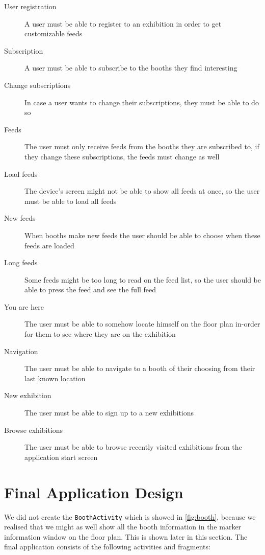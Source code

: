 \begin{description}
\item[User registration] A user must be able to register to an exhibition in order to get customizable feeds
\item[Subscription] A user must be able to subscribe to the booths they find interesting
\item[Change subscriptions] In case a user wants to change their subscriptions, they must be able to do so
\item[Feeds] The user must only receive feeds from the booths they are subscribed to, if they change these subscriptions, the feeds must change as well
\item[Load feeds] The device's screen might not be able to show all feeds at once, so the user must be able to load all feeds
\item[New feeds] When booths make new feeds the user should be able to choose when these feeds are loaded
\item[Long feeds] Some feeds might be too long to read on the feed list, so the user should be able to press the feed  and see the full feed
\item[You are here] The user must be able to somehow locate himself on the floor plan in-order for them to see where they are on the exhibition
\item[Navigation] The user must be able to navigate to a booth of their choosing from their last known location
\item[New exhibition] The user must be able to sign up to a new exhibitions 
\item[Browse exhibitions] The user must be able to browse recently visited exhibitions from the application start screen
\end{description}

\section{Final Application Design}\label{sec:finaldesign}

We did not create the \lstinline|BoothActivity| which is showed in \autoref{fig:booth}, because we realised that we might as well show all the booth information in the marker information window on the floor plan. This is shown later in this section. The final application consists of the following activities and fragments:


